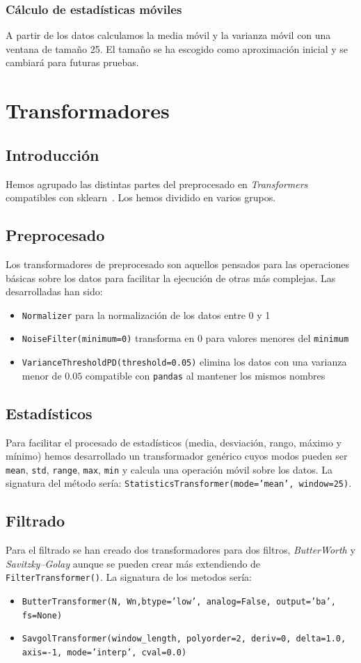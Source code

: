 \documentclass[a4paper,12pt,twoside,oldfontcommands]{memoir}
\begin{document}
\subsection{Cálculo de estadísticas móviles}
A partir de los datos calculamos la media móvil y la varianza móvil con una ventana de tamaño 25. El tamaño se ha escogido como aproximación inicial y se cambiará para futuras pruebas. 

\chapter{Transformadores}
\section{Introducción}
Hemos agrupado las distintas partes del preprocesado en \textit{Transformers} compatibles con sklearn~\cite{dreisbach_2015}. Los hemos dividido en varios grupos.
\section{Preprocesado}
Los transformadores de preprocesado son aquellos pensados para las operaciones básicas sobre los datos para facilitar la ejecución de otras más complejas. Las desarrolladas han sido:
\begin{itemize}
\item \texttt{Normalizer} para la normalización de los datos entre 0 y 1
\item \texttt{NoiseFilter(minimum=0)} transforma en 0 para valores menores del \texttt{minimum}
\item \texttt{VarianceThresholdPD(threshold=0.05)} elimina los datos con una varianza menor de \(0.05\) compatible con \texttt{pandas} al mantener los mismos nombres
\end{itemize}
\section{Estadísticos}
Para facilitar el procesado de estadísticos (media, desviación, rango, máximo y mínimo) hemos desarrollado un transformador genérico cuyos modos pueden ser \texttt{mean}, \texttt{std}, \texttt{range}, \texttt{max}, \texttt{min} y calcula una operación móvil sobre los datos. La signatura del método sería: \texttt{StatisticsTransformer(mode='mean', window=25)}.
\section{Filtrado}
Para el filtrado se han creado dos transformadores para dos filtros, \textit{ButterWorth} y \textit{Savitzky–Golay} aunque se pueden crear más extendiendo de \texttt{FilterTransformer()}. La signatura de los metodos sería:
\begin{itemize}
\item \texttt{ButterTransformer(N, Wn,btype='low', analog=False, output='ba', fs=None)}
\item \texttt{SavgolTransformer(window\_length, polyorder=2, deriv=0, delta=1.0, axis=-1, mode='interp', cval=0.0)}
\end{itemize}
\end{document}
